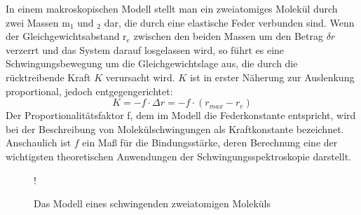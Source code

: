\documentclass[12pt]{article}
\begin{document}
In einem makroskopischen Modell stellt man ein zweiatomiges Molekül
durch zwei Massen m$_1$ und $_2$ dar, die durch eine elastische Feder verbunden sind.
Wenn der Gleichgewichtsabstand r$_e$ zwischen den beiden Massen um den Betrag $\delta r$
verzerrt und das System darauf losgelassen wird, so führt es eine Schwingungsbewegung
um die Gleichgewichtslage aus, die durch die rücktreibende Kraft $K$ verursacht wird. $K$
ist in erster Näherung zur Auslenkung proportional, jedoch entgegengerichtet:
\begin{equation}\label{eq:harmonisch}
K = - f \cdot \Delta r = -f \cdot (r_{max} -r_e)
\end{equation}
Der Proportionalitätsfaktor f, dem im Modell die Federkonstante entspricht,
wird bei der Beschreibung von Molekülschwingungen als Kraftkonstante bezeichnet.
Anschaulich ist $f$ ein Maß für die Bindungsstärke, deren Berechnung eine der wichtigsten
theoretischen Anwendungen der Schwingungsspektroskopie darstellt.
\begin{figure}
\centering
\resizebox {.6\linewidth} {!} {
}
\caption{Das Modell eines schwingenden zweiatomigen Moleküls} \label{fig:M1}
\end{figure}
\end{document}
